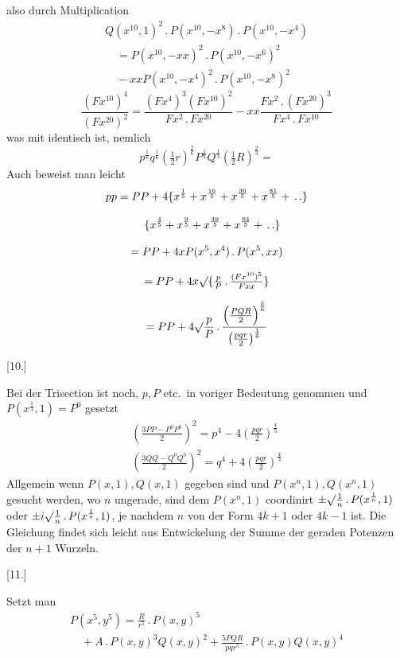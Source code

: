 also durch Multiplication
\[
\begin{gathered}
Q(x^{10},1)^2\, .\,P(x^{10},-x^8)\, .\,P(x^{10},-x^4)\\[8pt]
\quad=P(x^{10},-xx)^2\, .\,P(x^{10},-x^6)^2\\[8pt]\quad{}-xxP(x^{10},-x^4)^2\, .\,P(x^{10},-x^8)^2
\end{gathered}
\]
\[
\frac{(Fx^{10})^4}{(Fx^{20})^2}
=\frac{(Fx^4)^3(Fx^{10})^2}{Fx^2\, .\,Fx^{20}}
-xx\frac{Fx^2\, .\,(Fx^{20})^3}{Fx^4\, .\,Fx^{10}}
\]
was mit \GaussCircleArrow{} identisch ist, nemlich
\[
p^{\frac16}q^{\frac16}(\tfrac12r)^{\frac26}
P^{\frac{1}{3}}
Q^{\frac{1}{3}}
(\tfrac12R)^{\frac23}=
\]
Auch beweist man leicht
\[
\begin{gathered}
pp=PP+4\{x^{\frac15}+x^{\frac{16}5}+x^{\frac{36}5}+x^{\frac{81}5}+\, .\,.\}
\\[8pt]\quad{}\{x^{\frac45}+x^{\frac95}+x^{\frac{49}5}+x^{\frac{64}5}+\, .\,.\}\\[8pt]
=PP+4xP(x^5,x^4)\, .\,P(x^5,xx)\\[8pt]
=PP+4x\surd\{\tfrac pP\, .\,\tfrac{(Fx^{10})^5}{Fxx}\}\\[8pt]
=PP+4\surd\frac pP\, .\,\frac{\left(\frac{PQR}{2}\right)^{\frac56}}{\left(\frac{pqr}{2}\right)^{\frac16}}
\end{gathered}
\]
\par\medskip{}\centerline{[10.]}\nobreak\smallskip
Bei der Trisection ist noch, \(p,P\) etc.\ in voriger Bedeutung genommen
und \(P(x^{\frac13},1)=P^0\) gesetzt
\[
\begin{gathered}
\left(\frac{3PP-P^0P^0}{2}\right)^2=p^4-4\left(\frac{pqr}{2}\right)^{\frac43}\\[8pt]
\left(\frac{3QQ-Q^0Q^0}{2}\right)^2=q^4+4\left(\frac{pqr}{2}\right)^{\frac43}
\end{gathered}
\]
Allgemein wenn \(P(x,1),Q(x,1)\) gegeben sind und \(P(x^n,1),Q(x^n,1)\) gesucht werden,
wo \(n\) ungerade, sind dem \(P(x^n,1)\) coordinirt
\(\pm\surd\frac1n\, .\,P(x^{\frac1n},1)\)
oder \(\pm i\surd\frac1n\, .\,P(x^{\frac1n},1)\), je nachdem \(n\) von der Form
\(4k+1\) oder \(4k-1\) ist.
Die Gleichung findet sich leicht aus Entwickelung der Summe der geraden Potenzen
der \(n+1\) Wurzeln.
\par\medskip{}\centerline{[11.]}\nobreak\smallskip
Setzt man
\[
\begin{gathered}P(x^5,y^5)=\frac{R}{r^5}\, .\,P(x,y)^5
\\[8pt]\quad{}+A\, .\,P(x,y)^3Q(x,y)^2
+\frac{5PQR}{pqr^5}\, .\,P(x,y)Q(x,y)^4\end{gathered}
\]

